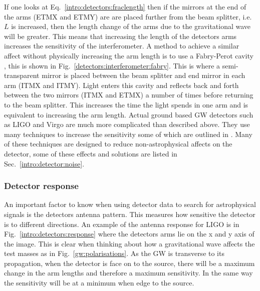 If one looks at Eq.~\ref{intro:detectors:fraclength} then if the mirrors at the end of the arms (ETMX and ETMY) are are placed further from the beam splitter, i.e. $L$ is increased, then the length change of the arms due to the gravitational wave will be greater.  
This means that increasing the length of the detectors arms increases the sensitivity of the interferometer. 
A method to achieve a similar affect without physically increasing the arm length is to use a Fabry-Perot cavity \citep{aasi2015AdvancedLIGO}, this is shown in Fig.~\ref{detectors:interferometer:fabry}.
This is where a semi-transparent mirror is placed between the beam splitter and end mirror in each arm (ITMX and ITMY).
Light enters this cavity and reflects back and forth between the two mirrors (ITMX and ETMX) a number of times before returning to the beam splitter.
This increases the time the light spends in one arm and is equivalent to increasing the arm length.
Actual ground based \gls{GW} detectors such as \gls{LIGO} \citep{abbott2009LIGOLaser} and Virgo \citep{acernese2015AdvancedVirgo} are much more complicated than described above.
They use many techniques to increase the sensitivity some of which are outlined in \citep{aasi2015AdvancedLIGO,abbott2009LIGOLaser}.
Many of these techniques are designed to reduce non-astrophysical affects on the detector, some of these effects and solutions are listed in Sec.~\ref{intro:detector:noise}.



\subsubsection{Detector response}

An important factor to know when using detector data to search for astrophysical signals is the detectors antenna pattern.
This measures how sensitive the detector is to different directions.
An example of the antenna response for \gls{LIGO} is in Fig.~\ref{intro:detectors:response} where the detectors arms lie on the x and y axis of the image.
This is clear when thinking about how a gravitational wave affects the test masses as in Fig.~\ref{gw:polarisations}. 
As the \gls{GW} is transverse to its propagation, when the detector is face on to the source, there will be a maximum change in the arm lengths and therefore a maximum sensitivity. 
In the same way the sensitivity will be at a minimum when edge to the source.


